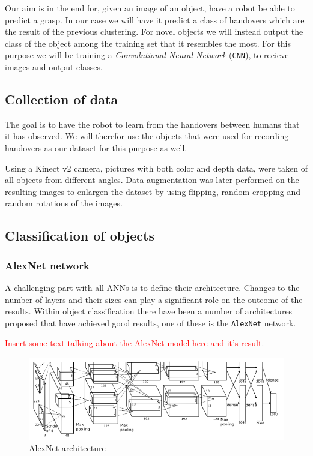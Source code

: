 Our aim is in the end for, given an image of an object, have a robot be able to predict a grasp. In our case we will have it predict a class of handovers which are the result of the previous clustering. For novel objects we will instead output the class of the object among the training set that it resembles the most. For this purpose we will be training a \emph{Convolutional Neural Network} (\texttt{CNN}), to recieve images and output classes.

\subsection{Collection of data}

The goal is to have the robot to learn from the handovers between humans that it has observed. We will therefor use the objects that were used for recording handovers as our dataset for this purpose as well.

Using a Kinect v2 camera, pictures with both color and depth data, were taken of all objects from different angles. Data augmentation was later performed on the resulting images to enlargen the dataset by using flipping, random cropping and random rotations of the images.

\subsection{Classification of objects}

\subsubsection{AlexNet network}

A challenging part with all ANNs is to define their architecture. Changes to the number of layers and their sizes can play a significant role on the outcome of the results. Within object classification there have been a number of architectures proposed that have achieved good results, one of these is the \texttt{AlexNet} network.

\textcolor{red}{Insert some text talking about the AlexNet model here and it's result}.

\begin{figure}
	\centering
	\includegraphics[width=\textwidth]{img/methods/alexnet_original.png}
	\caption{AlexNet architecture}
	\label{fig:alexnet_orig}
\end{figure}


